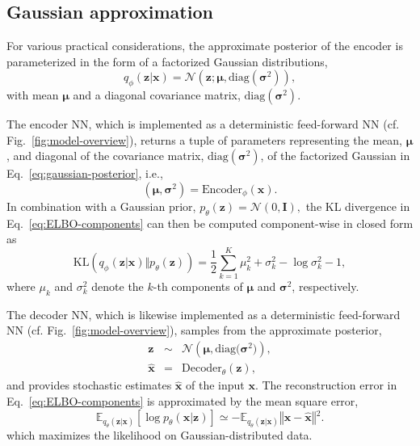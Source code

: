 \documentclass[english,a4paper,10pt]{scrartcl}
\begin{document}
\subsection{Gaussian approximation}\label{sec:gaussian-approximation}

For various practical considerations, the approximate posterior of the encoder is parameterized in the form of a factorized Gaussian distributions,
\begin{equation}
    q_{\phi}(\mathbf{z}|\mathbf{x})=\mathcal{N}\left(\mathbf{z};\boldsymbol{\mu},\mathrm{diag}(\boldsymbol{\sigma}^{2})\right),\label{eq:gaussian-posterior}
\end{equation}
with mean $\boldsymbol{\mu}$ and a diagonal covariance matrix, $\mathrm{diag}(\boldsymbol{\sigma}^{2})$.

The encoder NN, which is implemented as a deterministic feed-forward NN (cf. Fig.~\ref{fig:model-overview}), returns a tuple of parameters representing the mean, $\boldsymbol{\mu}$, and diagonal of the covariance matrix, $\mathrm{diag}(\boldsymbol{\sigma}^{2})$, of the factorized Gaussian in Eq.~\eqref{eq:gaussian-posterior}, i.e.,
\begin{equation}
    (\boldsymbol{\mu},\boldsymbol{\sigma}^{2})=\mathrm{Encoder}_{\phi}(\mathbf{x}).\label{eq:encoder-NN}
\end{equation}
In combination with a Gaussian prior, $p_{\theta}(\mathbf{z})=\mathcal{N}(0,\mathbf{I}),$ the KL divergence in Eq.~\eqref{eq:ELBO-components} can then be computed component-wise in closed form as
\begin{equation}
    \mathrm{KL}\left(q_{\phi}(\mathbf{z}|\mathbf{x})\Vert p_{\theta}(\mathbf{z})\right)=\frac{1}{2}\sum_{k=1}^{K}\mu_{k}^{2}+\sigma_{k}^{2}-\log\sigma_{k}^{2}-1,\label{eq:KL-gaussian}
\end{equation}
where $\mu_{k}$ and $\sigma_{k}^{2}$ denote the $k$-th components of $\boldsymbol{\mu}$ and $\boldsymbol{\sigma}^{2}$, respectively.

The decoder NN, which is likewise implemented as a deterministic feed-forward NN (cf. Fig.~\ref{fig:model-overview}), samples from the approximate posterior,
\begin{subequations}
    \begin{eqnarray}
        \mathbf{z} & \sim & \mathcal{N}\left(\boldsymbol{\mu},\mathrm{diag(}\boldsymbol{\boldsymbol{\sigma}}^{2})\right),\label{eq:sampling}\\
        \hat{\mathbf{x}} & = & \mathrm{Decoder}_{\theta}(\mathbf{z}),\label{eq:decoder-NN}
    \end{eqnarray}
\end{subequations}
and provides stochastic estimates $\hat{\mathbf{x}}$ of the input $\mathbf{x}$. The reconstruction error in Eq.~\eqref{eq:ELBO-components} is approximated by the mean square error,
\begin{equation}
    \mathbb{E}_{q_{\theta}(\mathbf{z}|\mathbf{x})}\left[\log p_{\theta}(\mathbf{x}|\mathbf{z})\right]\simeq-\mathbb{E}_{q_{\theta}(\mathbf{z}|\mathbf{x})}\left\Vert \mathbf{x}-\hat{\mathbf{x}}\right\Vert {}^{2}.\label{eq:MSE-x}
\end{equation}
which maximizes the likelihood on Gaussian-distributed data.
\end{document}
